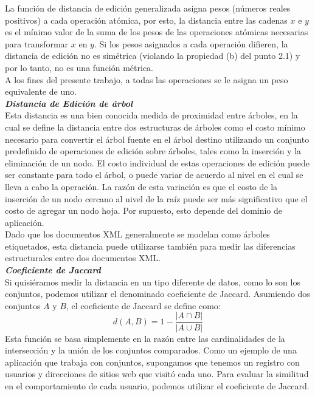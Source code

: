 La funci\'on de distancia de edici\'on generalizada asigna pesos (n\'umeros reales positivos) a cada operaci\'on at\'omica, por esto, la distancia entre las cadenas $x$ e $y$ es el m\'inimo valor de la suma de los pesos de las operaciones at\'omicas necesarias para transformar $x$ en $y$. Si los pesos asignados a cada operaci\'on difieren, la distancia de edici\'on no es sim\'etrica (violando la propiedad (b) del punto 2.1) y por lo tanto, no es una funci\'on m\'etrica.\\

A los fines del presente trabajo, a todas las operaciones se le asigna un peso equivalente de uno.\\

\noindent \textbf{\textit{Distancia de Edici\'on de \'arbol}}\\

Esta distancia es una bien conocida medida de proximidad entre \'arboles, en la cual se define la distancia entre dos estructuras de \'arboles como el costo m\'inimo necesario para convertir el \'arbol fuente en el \'arbol destino utilizando un conjunto predefinido de operaciones de edici\'on sobre \'arboles, tales como la inserci\'on y la eliminaci\'on de un nodo. El costo individual de estas operaciones de edici\'on puede ser constante para todo el \'arbol, o puede variar de acuerdo al nivel en el cual se lleva a cabo la operaci\'on. La raz\'on de esta variaci\'on es que el costo de la inserci\'on de un nodo cercano al nivel de la ra\'iz puede ser m\'as significativo que el costo de agregar un nodo hoja. Por supuesto, esto depende del dominio de aplicaci\'on.\\

Dado que los documentos XML generalmente se modelan como \'arboles etiquetados, esta distancia puede utilizarse tambi\'en para medir las diferencias estructurales entre dos documentos XML.\\

\noindent \textbf{\textit{Coeficiente de Jaccard}}\\

Si quisi\'eramos medir la distancia en un tipo diferente de datos, como lo son los conjuntos, podemos utilizar el denominado coeficiente de Jaccard. Asumiendo dos conjuntos $A$ y $B$, el coeficiente de Jaccard se define como:
\[
d(A,B) = 1 - \frac{|A \cap B|}{|A\cup B|}
\]
Esta funci\'on se basa simplemente en la raz\'on entre las cardinalidades de la intersecci\'on y la uni\'on de los conjuntos comparados. Como un ejemplo de una aplicaci\'on que trabaja con conjuntos, supongamos que tenemos un registro con usuarios y direcciones de sitios web que visit\'o cada uno. Para evaluar la similitud en el comportamiento de cada usuario, podemos utilizar el coeficiente de Jaccard.


